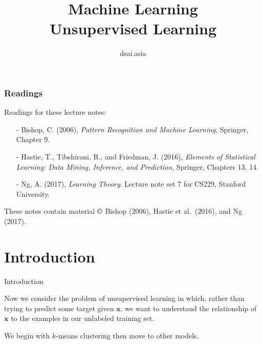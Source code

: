 \documentclass{beamer}
\title[Machine Learning]{Machine Learning\\Unsupervised Learning}
\author{dsai.asia}
\institute[]{
  Asian Data Science and Artificial Intelligence Master's Program}
\date{}
\renewcommand{\vec}[1]{\boldsymbol{#1}}
\begin{document}


\frame{\titlepage}

%

\begin{frame}
\frametitle{Readings}

Readings for these lecture notes:
\begin{itemize}
\item[-] Bishop, C. (2006), \textit{Pattern Recognition and Machine Learning},
  Springer, Chapter 9.
\item[-] Hastie, T., Tibshirani, R., and Friedman, J. (2016),
  \textit{Elements of Statistical Learning: Data Mining, Inference, and
    Prediction}, Springer, Chapters 13, 14.
\item[-] Ng, A. (2017), \textit{Learning Theory}.
  Lecture note set 7 for CS229, Stanford University.
\end{itemize}

These notes contain material $\copyright$ Bishop (2006), Hastie et
al.\ (2016), and Ng (2017).

\end{frame}

\section{Introduction}

\begin{frame}{Introduction}

  Now we consider the problem of \alert{unsupervised learning} in which,
  rather than trying to predict some target given $\vec{x}$, we want to
  understand the relationship of $\vec{x}$ to the examples in our
  unlabeled training set.

  \medskip

  We begin with $k$-means clustering then move to other models.
  
\end{frame}
\end{document}
